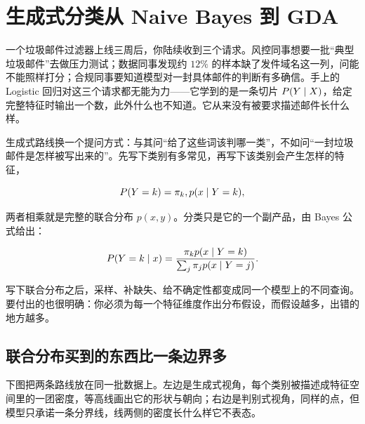 \section{生成式分类从 Naive Bayes 到 GDA}
\label{sec:13-Machine-Learning/06-Probabilistic-Models/01}

一个垃圾邮件过滤器上线三周后，你陆续收到三个请求。风控同事想要一批``典型垃圾邮件''去做压力测试；数据同事发现约 \(12\%\) 的样本缺了发件域名这一列，问能不能照样打分；合规同事要知道模型对一封具体邮件的判断有多确信。手上的 Logistic 回归对这三个请求都无能为力——它学到的是一条切片 \(P(Y\mid X)\)，给定完整特征时输出一个数，此外什么也不知道。它从来没有被要求描述邮件长什么样。

生成式路线换一个提问方式：与其问``给了这些词该判哪一类''，不如问``一封垃圾邮件是怎样被写出来的''。先写下类别有多常见，再写下该类别会产生怎样的特征，

\[
P(Y=k)=\pi_k,\space p(x\mid Y=k),
\]

两者相乘就是完整的联合分布 \(p(x,y)\)。分类只是它的一个副产品，由 Bayes 公式给出：

\[
P(Y=k\mid x)
=\frac{\pi_kp(x\mid Y=k)}
{\sum_j\pi_jp(x\mid Y=j)}.
\]

写下联合分布之后，采样、补缺失、给不确定性都变成同一个模型上的不同查询。要付出的也很明确：你必须为每一个特征维度作出分布假设，而假设越多，出错的地方越多。

\subsection{联合分布买到的东西比一条边界多}

下图把两条路线放在同一批数据上。左边是生成式视角，每个类别被描述成特征空间里的一团密度，等高线画出它的形状与朝向；右边是判别式视角，同样的点，但模型只承诺一条分界线，线两侧的密度长什么样它不表态。

